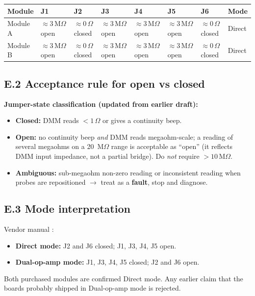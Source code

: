 \documentclass[11pt,a4paper]{article}
\newcommand{\Mohm}[1]{\ensuremath{#1\,\mathrm{M}\Omega}}
\newcommand{\Rohm}[1]{\ensuremath{#1\,\Omega}}
\begin{document}
\begin{center}
\scriptsize
\begin{tabular}{llllllll}
\toprule
\textbf{Module} & \textbf{J1} & \textbf{J2} & \textbf{J3} & \textbf{J4} & \textbf{J5} & \textbf{J6} & \textbf{Mode}\\
\midrule
Module A & $\approx\Mohm{3}$ open & $\approx\Rohm{0}$ closed & $\approx\Mohm{3}$ open & $\approx\Mohm{3}$ open & $\approx\Mohm{3}$ open & $\approx\Rohm{0}$ closed & Direct\\
Module B & $\approx\Mohm{3}$ open & $\approx\Rohm{0}$ closed & $\approx\Mohm{3}$ open & $\approx\Mohm{3}$ open & $\approx\Mohm{3}$ open & $\approx\Rohm{0}$ closed & Direct\\
\bottomrule
\end{tabular}
\end{center}

\subsection{E.2 Acceptance rule for open vs closed}

\begin{rulebox}
\textbf{Jumper-state classification (updated from earlier draft):}
\begin{itemize}
\item \textbf{Closed:} DMM reads $<\Rohm{1}$ or gives a continuity beep.
\item \textbf{Open:} no continuity beep \emph{and} DMM reads megaohm-scale; a reading of several megaohms on a 20~M$\Omega$ range is acceptable as ``open'' (it reflects DMM input impedance, not a partial bridge). Do \emph{not} require $>\Mohm{10}$.
\item \textbf{Ambiguous:} sub-megaohm non-zero reading or inconsistent reading when probes are repositioned $\rightarrow$ treat as a \textbf{fault}, stop and diagnose.
\end{itemize}
\end{rulebox}

\subsection{E.3 Mode interpretation}

Vendor manual \cite{vendorManual}:
\begin{itemize}
\item \textbf{Direct mode:} J2 and J6 closed; J1, J3, J4, J5 open.
\item \textbf{Dual-op-amp mode:} J1, J3, J4, J5 closed; J2 and J6 open.
\end{itemize}
Both purchased modules are confirmed Direct mode. Any earlier claim that the boards probably shipped in Dual-op-amp mode is rejected.
\end{document}
